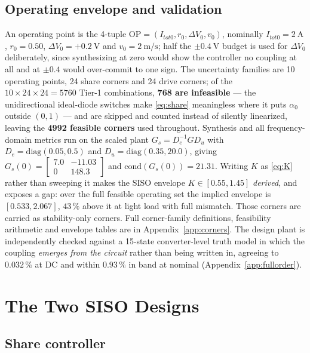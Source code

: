 \documentclass[energies,article,submit,pdftex,oneauthor]{Definitions/mdpi}
\begin{document}
\subsection{Operating envelope and validation}
\label{sec:envelope}

An operating point is the 4-tuple $\mathrm{OP} = (I_{tot0}, r_0, \Delta V_0, v_0)$, nominally
$I_{tot0} = \SI{2}{\ampere}$, $r_0 = 0.50$, $\Delta V_0 = +\SI{0.2}{\volt}$ and
$v_0 = \SI{2}{\meter\per\second}$; half the $\pm\SI{0.4}{\volt}$ budget is used for $\Delta V_0$
deliberately, since synthesizing at zero would show the controller no coupling at all and at
$\pm0.4$ would over-commit to one sign. The uncertainty families are 10 operating points, 24
share corners and 24 drive corners; of the $10\times24\times24 = 5760$ Tier-1 combinations,
\textbf{768 are infeasible} --- the unidirectional ideal-diode switches make \eqref{eq:share}
meaningless where it puts $\alpha_0$ outside $(0,1)$ --- and are skipped and counted instead of
silently linearized, leaving the \textbf{4992 feasible corners} used throughout. Synthesis and
all frequency-domain metrics run on the scaled plant $G_s = D_e^{-1} G D_u$ with
$D_e = \mathrm{diag}(0.05, 0.5)$ and $D_u = \mathrm{diag}(0.35, 20.0)$, giving
$G_s(0) = \left[\begin{smallmatrix} 7.0 & -11.03 \\ 0 & 148.3 \end{smallmatrix}\right]$ and
$\mathrm{cond}(G_s(0)) = 21.31$. Writing $K$ as \eqref{eq:K} rather than sweeping it makes the
SISO envelope $K\in[0.55,1.45]$ \emph{derived}, and exposes a gap: over the full feasible
operating set the implied envelope is $[0.533, 2.067]$, $43\,\%$ above it at light load with full
mismatch. Those corners are carried as stability-only corners. Full corner-family definitions,
feasibility arithmetic and envelope tables are in Appendix~\ref{app:corners}. The design plant is
independently checked against a 15-state converter-level truth model in which the coupling
\emph{emerges from the circuit} rather than being written in, agreeing to $0.032\,\%$ at DC and
within $0.93\,\%$ in band at nominal (Appendix~\ref{app:fullorder}).

\section{The Two SISO Designs}
\label{sec:siso}

\subsection{Share controller}
\end{document}
